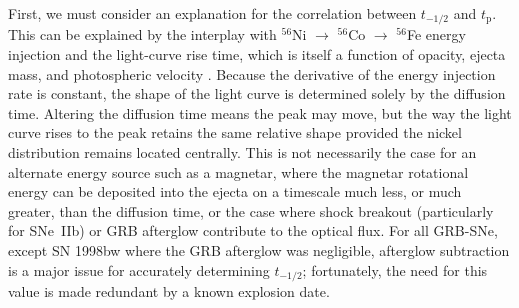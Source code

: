 \documentclass[a4paper,fleqn,usenatbib]{mnras}
\begin{document}
First, we must consider an explanation for the correlation between $t_{-1/2}$ and $t_{\mathrm{p}}$. This can be explained by the interplay with $^{56}$Ni $\rightarrow$ $^{56}$Co $\rightarrow$ $^{56}$Fe energy injection and the light-curve rise time, which is itself a function of opacity, ejecta mass, and photospheric velocity \citep{Arnett1982}. Because the derivative of the energy injection rate is constant, the shape of the light curve is determined solely by the diffusion time. Altering the diffusion time means the peak may move, but the way the light curve rises to the peak retains the same relative shape provided the nickel distribution remains located centrally. This is not necessarily the case for an alternate energy source such as a magnetar, where the magnetar rotational energy can be deposited into the ejecta on a timescale much less, or much greater, than the diffusion time, or the case where shock breakout (particularly for SNe~IIb) or GRB afterglow contribute to the optical flux. For all GRB-SNe, except SN 1998bw where the GRB afterglow was negligible, afterglow subtraction is a major issue for accurately determining $t_{-1/2}$; fortunately, the need for this value is made redundant by a known explosion date.
\end{document}
